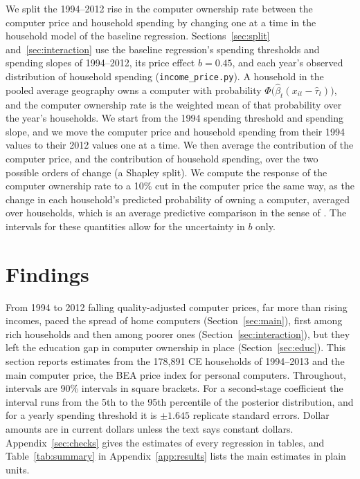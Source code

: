\documentclass[11pt]{article}
\begin{document}
We split the 1994--2012 rise in the computer ownership rate between the computer price and household spending by changing one at a time in the household model of the baseline regression. Sections~\ref{sec:split} and~\ref{sec:interaction} use the baseline regression's spending thresholds and spending slopes of 1994--2012, its price effect $b = 0.45$, and each year's observed distribution of household spending (\texttt{income\_price.py}). A household in the pooled average geography owns a computer with probability $\Phi\big(\hat\beta_t(x_{it} - \hat\tau_t)\big)$, and the computer ownership rate is the weighted mean of that probability over the year's households. We start from the 1994 spending threshold and spending slope, and we move the computer price and household spending from their 1994 values to their 2012 values one at a time. We then average the contribution of the computer price, and the contribution of household spending, over the two possible orders of change (a Shapley split). We compute the response of the computer ownership rate to a 10\% cut in the computer price the same way, as the change in each household's predicted probability of owning a computer, averaged over households, which is an average predictive comparison in the sense of \citet{gelman2007apc}. The intervals for these quantities allow for the uncertainty in $b$ only.

\section{Findings}
\label{sec:findings}

From 1994 to 2012 falling quality-adjusted computer prices, far more than rising incomes, paced the spread of home computers (Section~\ref{sec:main}), first among rich households and then among poorer ones (Section~\ref{sec:interaction}), but they left the education gap in computer ownership in place (Section~\ref{sec:educ}). This section reports estimates from the 178{,}891 CE households of 1994--2013 and the main computer price, the BEA price index for personal computers. Throughout, intervals are 90\% intervals in square brackets. For a second-stage coefficient the interval runs from the 5th to the 95th percentile of the posterior distribution, and for a yearly spending threshold it is $\pm 1.645$ replicate standard errors. Dollar amounts are in current dollars unless the text says constant dollars. Appendix~\ref{sec:checks} gives the estimates of every regression in tables, and Table~\ref{tab:summary} in Appendix~\ref{app:results} lists the main estimates in plain units.
\end{document}
